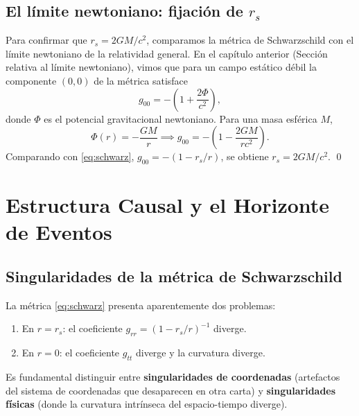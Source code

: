 \subsection{El límite newtoniano: fijación de \texorpdfstring{$r_s$}{rs}}
\label{sec:limite_newtoniano_schwarz}

Para confirmar que $r_s = 2GM/c^2$, comparamos la métrica de Schwarzschild con el límite newtoniano de la relatividad general. En el capítulo anterior (Sección relativa al límite newtoniano), vimos que para un campo estático débil la componente $(0,0)$ de la métrica satisface
\begin{equation}
  g_{00} = -\left(1 + \frac{2\Phi}{c^2}\right),
\end{equation}
donde $\Phi$ es el potencial gravitacional newtoniano. Para una masa esférica $M$,
\begin{equation}
  \Phi(r) = -\frac{GM}{r} \implies g_{00} = -\left(1 - \frac{2GM}{rc^2}\right).
\end{equation}
Comparando con \eqref{eq:schwarz}, $g_{00} = -(1 - r_s/r)$, se obtiene $r_s = 2GM/c^2$. \qed

\section{Estructura Causal y el Horizonte de Eventos}
\label{sec:horizonte}

\subsection{Singularidades de la métrica de Schwarzschild}

La métrica \eqref{eq:schwarz} presenta aparentemente dos problemas:
\begin{enumerate}[leftmargin=2em, label=\textbf{\arabic*.}]
  \item En $r = r_s$: el coeficiente $g_{rr} = (1-r_s/r)^{-1}$ diverge.
  \item En $r = 0$: el coeficiente $g_{tt}$ diverge y la curvatura diverge.
\end{enumerate}

Es fundamental distinguir entre \textbf{singularidades de coordenadas} (artefactos del sistema de coordenadas que desaparecen en otra carta) y \textbf{singularidades físicas} (donde la curvatura intrínseca del espacio-tiempo diverge).

